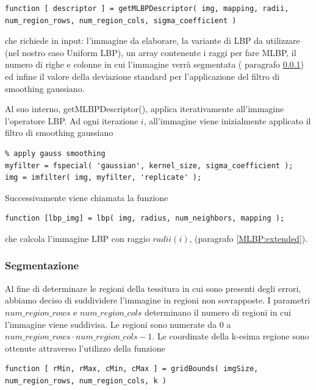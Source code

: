 \begin{lstlisting}
function [ descriptor ] = getMLBPDescriptor( img, mapping, radii, num_region_rows, num_region_cols, sigma_coefficient )
\end{lstlisting}

che richiede in input: l'immagine da elaborare, la variante di \acs{LBP} da utilizzare (nel nostro caso Uniform LBP), un array contenente i raggi per fare \acs{MLBP}, il numero di righe e colonne in cui l'immagine verrà segmentata ( paragrafo \ref{imp:seg}) ed infine il valore della deviazione standard per l'applicazione del filtro di smoothing gaussiano.

Al suo interno, getMLBPDescriptor(), applica iterativamente all'immagine l'operatore \acs{LBP}.
Ad ogni iterazione $i$, all'immagine viene inizialmente applicato il filtro di smoothing gaussiano

\begin{lstlisting}
% apply gauss smoothing
myfilter = fspecial( 'gaussian', kernel_size, sigma_coefficient );
img = imfilter( img, myfilter, 'replicate' );
\end{lstlisting}

\noindent Successivamente viene chiamata la funzione\cite{lbpcode}

\begin{lstlisting}
function [lbp_img] = lbp( img, radius, num_neighbors, mapping );
\end{lstlisting}

\noindent che calcola l'immagine \acs{LBP} con raggio $radii(i)$, (paragrafo \ref{MLBP:extended}).

\subsubsection{Segmentazione}
\label{imp:seg}
Al fine di determinare le regioni della tessitura in cui sono presenti degli errori, abbiamo deciso di suddividere l'immagine in regioni non sovrapposte. I parametri $num\_region\_rows$ e $num\_region\_cols$ determinano il numero di regioni in cui l'immagine viene suddivisa.
Le regioni sono numerate da $0$ a $num\_region\_rows \cdot num\_region\_cols - 1$.
Le coordinate della k-esima regione sono ottenute attraverso l'utilizzo della funzione

\begin{lstlisting}
function [ rMin, rMax, cMin, cMax ] = gridBounds( imgSize, num_region_rows, num_region_cols, k )
\end{lstlisting}

